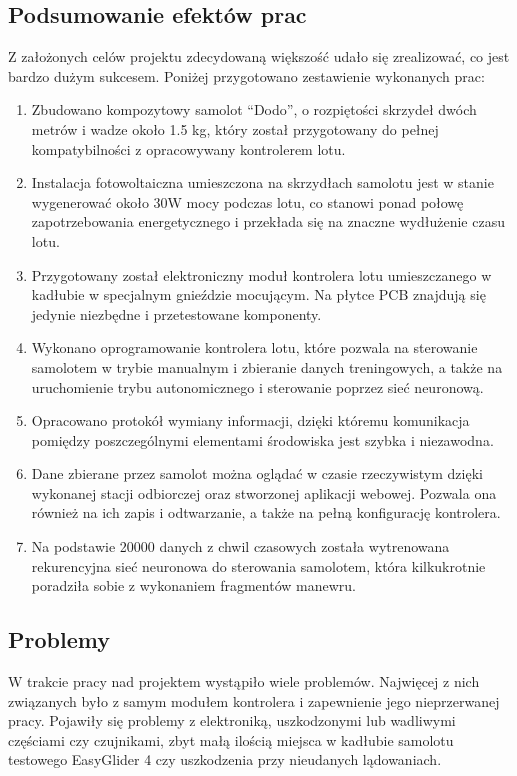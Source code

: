 \documentclass[12pt, a4paper]{article}
\begin{document}
\subsection{Podsumowanie efektów prac}
Z założonych celów projektu zdecydowaną większość udało się zrealizować, co jest bardzo dużym sukcesem. Poniżej przygotowano zestawienie wykonanych prac:
\begin{enumerate}
\item Zbudowano kompozytowy samolot ``Dodo'', o rozpiętości skrzydeł dwóch metrów i wadze około 1.5 kg, który został przygotowany do pełnej kompatybilności z opracowywany kontrolerem lotu. 
\item Instalacja fotowoltaiczna umieszczona na skrzydłach samolotu jest w stanie wygenerować około 30W mocy podczas lotu, co stanowi ponad połowę zapotrzebowania energetycznego i przekłada się na znaczne wydłużenie czasu lotu.
\item Przygotowany został elektroniczny moduł kontrolera lotu umieszczanego w kadłubie w specjalnym gnieździe mocującym. Na płytce PCB znajdują się jedynie niezbędne i przetestowane komponenty.
\item Wykonano oprogramowanie kontrolera lotu, które pozwala na sterowanie samolotem w trybie manualnym i zbieranie danych treningowych, a także na uruchomienie trybu autonomicznego i sterowanie poprzez sieć neuronową.
\item Opracowano protokół wymiany informacji, dzięki któremu komunikacja pomiędzy poszczególnymi elementami środowiska jest szybka i niezawodna.
\item Dane zbierane przez samolot można oglądać w czasie rzeczywistym dzięki wykonanej stacji odbiorczej oraz stworzonej aplikacji webowej. Pozwala ona również na ich zapis i odtwarzanie, a także na pełną konfigurację kontrolera.
\item Na podstawie 20000 danych z chwil czasowych została wytrenowana rekurencyjna sieć neuronowa do sterowania samolotem, która kilkukrotnie poradziła sobie z wykonaniem fragmentów manewru.

\end{enumerate}

\subsection{Problemy}
W trakcie pracy nad projektem wystąpiło wiele problemów. Najwięcej z nich związanych było z samym modułem kontrolera i zapewnienie jego nieprzerwanej pracy. Pojawiły się problemy z elektroniką, uszkodzonymi lub wadliwymi częściami czy czujnikami, zbyt małą ilością miejsca w kadłubie samolotu testowego EasyGlider 4 czy uszkodzenia przy nieudanych lądowaniach. 
\end{document}

